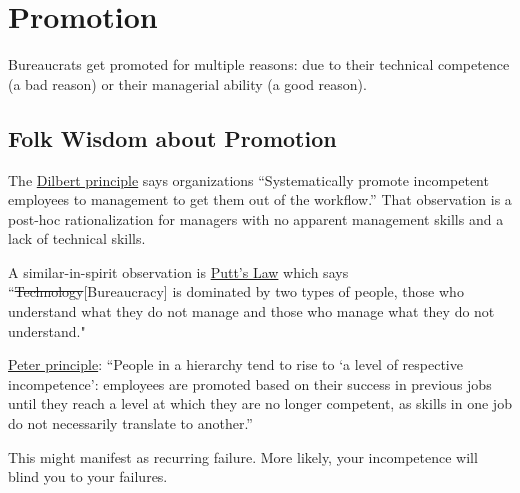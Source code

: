 \section{Promotion\label{sec:promotion}}

Bureaucrats get promoted for multiple reasons: due to their technical competence (a bad reason) or their managerial ability (a good reason).  

\subsection*{Folk Wisdom about Promotion}

The 
\href{https://en.wikipedia.org/wiki/Dilbert_principle}{Dilbert principle}
says organizations
``Systematically promote incompetent employees to management to get them out of the workflow.''
That observation is a post-hoc rationalization for managers with no apparent management skills and a lack of technical skills. 

A similar-in-spirit observation is 
\href{https://en.wikipedia.org/wiki/Putt\%27s_Law_and_the_Successful_Technocrat}{Putt's Law}
which says
``\sout{Technology}[Bureaucracy] is dominated by two types of people, those who understand what they do not manage and those who manage what they do not understand."


\href{https://en.wikipedia.org/wiki/Peter_principle}{Peter principle}:
``People in a hierarchy tend to rise to `a level of respective incompetence': employees are promoted based on their success in previous jobs until they reach a level at which they are no longer competent, as skills in one job do not necessarily translate to another.''

This might manifest as recurring failure. More likely, your incompetence will blind you to your failures.

